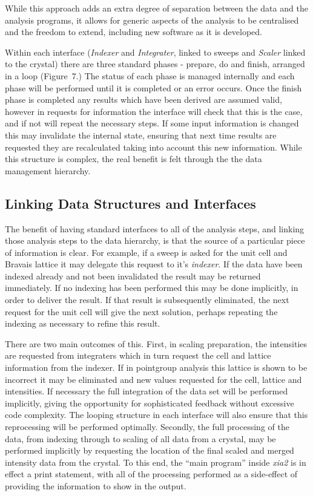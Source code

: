 \documentclass[a4paper, 11pt]{article}
\begin{document}
While this approach adds an extra degree of separation between the
data and the analysis programs, it allows for generic aspects of the
analysis to be centralised and the freedom to extend, including
new software as it is developed. 

Within each interface (\emph{Indexer} and \emph{Integrater}, linked to
sweeps and 
\emph{Scaler} linked to the crystal) there are three standard phases -
prepare, do and 
finish, arranged in a loop (Figure~7.) 
The status of each phase is
managed internally and each phase will be performed until it is
completed or an error occurs. Once the finish phase is completed any
results which have been derived are assumed valid, however in requests
for information the interface will check that this is the case, and if
not will repeat the necessary steps. If some input information is
changed this may invalidate the internal state, ensuring that next
time results are requested they are recalculated taking into account
this new information. While this structure is complex, the
real benefit is felt through the the data management hierarchy.

\subsection{Linking Data Structures and Interfaces}

The benefit of having standard interfaces to all of the analysis
steps, and linking those analysis steps to the data hierarchy, is that
the source of a particular piece of information
is clear. For example, if a sweep is asked for the unit cell and Bravais
lattice it may delegate this request to it's 
\emph{indexer}. If the data have
been indexed already and not been invalidated 
the result may be returned
immediately. If no indexing has been performed this may be done
implicitly, in order to deliver the result. If that result is
subsequently eliminated, the next request for the unit cell will give
the next solution, perhaps repeating the indexing as necessary to
refine this result. 

There are two main outcomes of this. First, in scaling preparation, 
the intensities are requested from integraters which in turn request
the cell and lattice
information from the indexer. If in pointgroup analysis this
lattice is shown to be incorrect it may be eliminated and new
values requested for the cell, lattice and intensities. If necessary
the full integration of the data set will be performed implicitly,
giving the opportunity for sophisticated feedback without excessive
code complexity. The looping structure in each interface will also
ensure that this reprocessing will be performed optimally.
Secondly, the full processing
of the data, from indexing through to scaling of all data from a
crystal, may be performed implicitly by requesting the location of the
final scaled and merged intensity data from the crystal. To this end,
the ``main program'' inside \emph{xia2} is in effect a print statement,
with all of the processing performed as a side-effect of providing the
information to show in the output.
\end{document}
